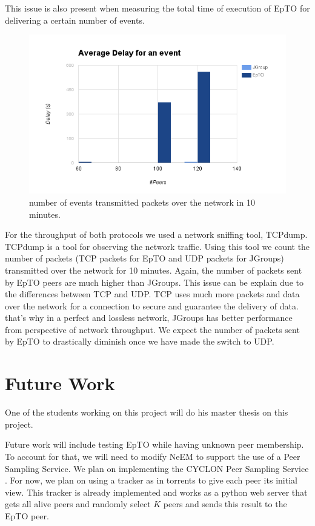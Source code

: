 \documentclass[10pt,conference,a4paper]{IEEEtran}
\begin{document}
\par
This issue is also present when measuring the total time of execution of EpTO for delivering a certain number of events.
\par
\begin{figure}
\includegraphics[width=\linewidth]{figures/throughput.png}
\caption{number of events transmitted packets over the network in 10 minutes.}
\label{fig:throughput}
\end{figure}
For the throughput of both protocols we used a network sniffing tool, TCPdump. TCPdump is a tool for observing the network traffic. Using this tool we count the number of packets (TCP packets for EpTO and UDP packets for JGroups) transmitted over the network for 10 minutes. Again, the number of packets sent by EpTO peers are much higher than JGroups. This issue can be explain due to the differences between TCP and UDP. TCP uses much more packets and data over the network for a connection to secure and guarantee the delivery of data. that's why in a perfect and lossless network, JGroups has better performance from perspective of network throughput. We expect the number of packets sent by EpTO to drastically diminish once we have made the switch to UDP.
\section{Future Work}
One of the students working on this project will do his master thesis on this project.

Future work will include testing EpTO while having unknown peer membership. To account for that, we will need to modify NeEM to support the use of a Peer Sampling Service. We plan on implementing the CYCLON Peer Sampling Service \autocite{Voulgaris2005}. For now, we plan on using a tracker as in torrents to give each peer its initial view. This tracker is already implemented and works as a python web server that gets all alive peers and randomly select $K$ peers and sends this result to the EpTO peer.
\end{document}
